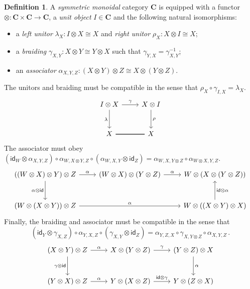 \documentclass[11pt,oneside]{book}
\theoremstyle{definition}
\newtheorem{definition}[theorem]{Definition}
\newcommand{\kw}[1]{\ensuremath{ \mathsf{#1} }}
\begin{document}
\begin{definition}
A \emph{symmetric monoidal} category $\mathbf{C}$
is equipped with a functor
${\otimes} : \mathbf{C} \times \mathbf{C} \rightarrow \mathbf{C}$,
a \emph{unit object} $I \in \mathbf{C}$
and the following natural isomorphisms:
\begin{itemize}
  \item a \emph{left unitor} $\lambda_X : I \otimes X \cong X$ and
          \emph{right unitor} $\rho_X : X \otimes I \cong X$;
  \item a \emph{braiding} $\gamma_{X,Y} : X \otimes Y \cong Y \otimes X$
    such that $\gamma_{Y,X} = \gamma_{X,Y}^{-1}$;
  \item an \emph{associator}
    $\alpha_{X,Y,Z} : (X \otimes Y) \otimes Z \cong X \otimes (Y \otimes Z)$.
\end{itemize}
The unitors and braiding must be compatible in the
sense that $\rho_X \circ \gamma_{I, X} = \lambda_X$.
\[
  \begin{tikzcd}[row sep=large]
    I \otimes X \ar[d, "\lambda"'] \ar[r, "\gamma"] &
    X \otimes I \ar[d, "\rho"] \\
    X \ar[r, dash, double] &
    X
  \end{tikzcd}
\]
The associator must obey
$(\kw{id}_W \otimes \alpha_{X,Y,Z}) \circ
 \alpha_{W, X \otimes Y, Z} \circ
 (\alpha_{W,X,Y} \otimes \kw{id}_Z) =
 \alpha_{W, X, Y \otimes Z} \circ
 \alpha_{W \otimes X, Y, Z}$.
\[
  \begin{tikzcd}[row sep=large]
    ((W \otimes X) \otimes Y) \otimes Z
      \ar[r, "\alpha"]
      \ar[d, "\alpha \otimes \kw{id}"']
    &
    (W \otimes X) \otimes (Y \otimes Z)
      \ar[r, "\alpha"]
    &
    W \otimes (X \otimes (Y \otimes Z))
    \\
    (W \otimes (X \otimes Y)) \otimes Z
      \ar[rr, "\alpha"]
    & &
    W \otimes ((X \otimes Y) \otimes X)
      \ar[u, "\kw{id} \otimes \alpha"']
  \end{tikzcd}
\]
Finally,
the braiding and associator must be compatible
in the sense that
\[
  (\kw{id}_Y \otimes \gamma_{X,Z}) \circ
  \alpha_{Y,X,Z} \circ
  (\gamma_{X,Y} \otimes \kw{id}_Z) =
  \alpha_{Y,Z,X} \circ \gamma_{X,Y \otimes Z} \circ \alpha_{X,Y,Z}
  \,.
\]
\[
  \begin{tikzcd}[row sep=large]
    (X \otimes Y) \otimes Z
      \ar[r, "\alpha"]
      \ar[d, "\gamma \otimes \kw{id}"']
    &
    X \otimes (Y \otimes Z)
      \ar[r, "\gamma"]
    &
    (Y \otimes Z) \otimes X
      \ar[d, "\alpha"]
    \\
    (Y \otimes X) \otimes Z
      \ar[r, "\alpha"]
    &
    Y \otimes (X \otimes Z)
      \ar[r, "\kw{id} \otimes \gamma"]
    &
    Y \otimes (Z \otimes X)
  \end{tikzcd}
\]
\end{definition}
\end{document}
